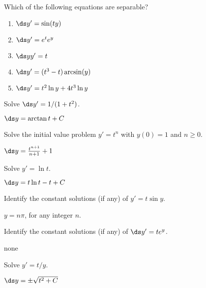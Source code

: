 \begin{enumialphparenastyle}

\begin{ex}
 Which of the following equations are separable?

\begin{enumerate}
	\item $\ds y' = \sin (ty)$
	\item $\ds y' = e^t e^y $
	\item $\ds yy' = t $
	\item $\ds y' = (t^3 -t) \arcsin(y)$
	\item $\ds y' = t^2 \ln y + 4t^3 \ln y $
\end{enumerate}
\end{ex}

\begin{ex}
 Solve $\ds y' = 1/(1+t^2)$.
\begin{sol}
 $\ds y=\arctan t + C$
\end{sol}
\end{ex}

\begin{ex}
 Solve the initial value problem $y' = t^n$ with
$y(0)=1$ and $n\ge 0$.
\begin{sol}
 $\ds y={t^{n+1}\over n+1}+1$
\end{sol}
\end{ex}

\begin{ex}
 Solve $y' = \ln t$. 
\begin{sol}
 $\ds y=t\ln t-t+C$
\end{sol}
\end{ex}

\begin{ex}
 Identify the constant solutions (if any) of $y' =t\sin y$.
\begin{sol}
 $y=n\pi$, for any integer $n$.
\end{sol}
\end{ex}

\begin{ex}
 Identify the constant solutions (if any) of $\ds y'=te^y$.
\begin{sol}
 none
\end{sol}
\end{ex}

\begin{ex}
 Solve $y' = t/y$.
\begin{sol}
 $\ds y=\pm\sqrt{t^2+C}$
\end{sol}
\end{ex}


\end{enumialphparenastyle}
